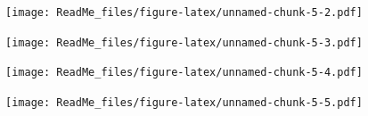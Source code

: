 \documentclass[
]{article}
\newenvironment{Shaded}{\begin{snugshade}}{\end{snugshade}}
\newcommand{\CommentTok}[1]{\textcolor[rgb]{0.56,0.35,0.01}{\textit{#1}}}
\newcommand{\DataTypeTok}[1]{\textcolor[rgb]{0.13,0.29,0.53}{#1}}
\newcommand{\DecValTok}[1]{\textcolor[rgb]{0.00,0.00,0.81}{#1}}
\newcommand{\FloatTok}[1]{\textcolor[rgb]{0.00,0.00,0.81}{#1}}
\newcommand{\KeywordTok}[1]{\textcolor[rgb]{0.13,0.29,0.53}{\textbf{#1}}}
\newcommand{\NormalTok}[1]{#1}
\newcommand{\OperatorTok}[1]{\textcolor[rgb]{0.81,0.36,0.00}{\textbf{#1}}}
\newcommand{\StringTok}[1]{\textcolor[rgb]{0.31,0.60,0.02}{#1}}
\begin{document}
\texttt{[image: ReadMe\_files/figure-latex/unnamed-chunk-5-2.pdf]}

\begin{Shaded}
\end{Shaded}

\texttt{[image: ReadMe\_files/figure-latex/unnamed-chunk-5-3.pdf]}

\begin{Shaded}
\end{Shaded}

\texttt{[image: ReadMe\_files/figure-latex/unnamed-chunk-5-4.pdf]}

\begin{Shaded}
\end{Shaded}

\texttt{[image: ReadMe\_files/figure-latex/unnamed-chunk-5-5.pdf]}

\begin{Shaded}
\end{Shaded}
\end{document}
